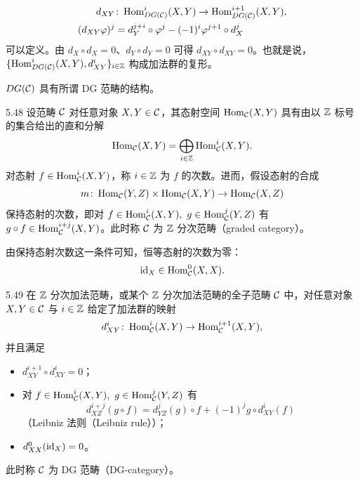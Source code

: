 \[
\begin{aligned}
  d_{XY} &\colon \operatorname{Hom}^{i}_{DG(\mathcal{C})}(X,Y) \to \operatorname{Hom}^{i+1}_{DG(\mathcal{C})}(X,Y),\\
  (d_{XY}\varphi)^{j} &= d^{j+i}_{Y}\circ\varphi^{j} - (-1)^{i}\varphi^{j+1}\circ d^{j}_{X}
\end{aligned}
\]
可以定义。由 $d_{X}\circ d_{X} = 0$、$d_{Y}\circ d_{Y} = 0$ 可得 $d_{XY}\circ d_{XY} = 0$。也就是说，$\{\operatorname{Hom}^{i}_{DG(\mathcal{C})}(X,Y), d^{i}_{XY}\}_{i\in\mathbb{Z}}$ 构成加法群的复形。


$DG(\mathcal{C})$ 具有所谓 DG 范畴的结构。

\begin{definition}{5.48} 设范畴 $\mathcal{C}$ 对任意对象 $X,Y \in \mathcal{C}$，其态射空间 $\operatorname{Hom}_{\mathcal{C}}(X,Y)$ 具有由以 $\mathbb{Z}$ 标号的集合给出的直和分解
\[
  \operatorname{Hom}_{\mathcal{C}}(X,Y) = \bigoplus_{i\in\mathbb{Z}}\operatorname{Hom}^{i}_{\mathcal{C}}(X,Y).
\]
对态射 $f \in \operatorname{Hom}^{i}_{\mathcal{C}}(X,Y)$，称 $i \in \mathbb{Z}$ 为 $f$ 的次数。进而，假设态射的合成
\[
  m \colon \operatorname{Hom}_{\mathcal{C}}(Y,Z) \times \operatorname{Hom}_{\mathcal{C}}(X,Y) \to \operatorname{Hom}_{\mathcal{C}}(X,Z)
\]
保持态射的次数，即对 $f \in \operatorname{Hom}^{i}_{\mathcal{C}}(X,Y),\ g \in \operatorname{Hom}^{j}_{\mathcal{C}}(Y,Z)$ 有 $g\circ f \in \operatorname{Hom}^{i+j}_{\mathcal{C}}(X,Y)$。此时称 $\mathcal{C}$ 为 $\mathbb{Z}$ 分次范畴（graded category）。\end{definition}


由保持态射次数这一条件可知，恒等态射的次数为零：
\[
  \mathrm{id}_{X} \in \operatorname{Hom}^{0}_{\mathcal{C}}(X,X).
\]

\begin{definition}{5.49} 在 $\mathbb{Z}$ 分次加法范畴，或某个 $\mathbb{Z}$ 分次加法范畴的全子范畴 $\mathcal{C}$ 中，对任意对象 $X,Y \in \mathcal{C}$ 与 $i \in \mathbb{Z}$ 给定了加法群的映射
\[
  d^{i}_{XY} \colon \operatorname{Hom}^{i}_{\mathcal{C}}(X,Y) \to \operatorname{Hom}^{i+1}_{\mathcal{C}}(X,Y),
\]
并且满足
\begin{itemize}
  \item $d^{i+1}_{XY}\circ d^{i}_{XY} = 0$；
  \item 对 $f \in \operatorname{Hom}^{i}_{\mathcal{C}}(X,Y),\ g \in \operatorname{Hom}^{j}_{\mathcal{C}}(Y,Z)$ 有
  \[
    d^{i+j}_{XZ}(g\circ f) = d^{j}_{YZ}(g)\circ f + (-1)^{j}g\circ d^{i}_{XY}(f)
  \]
  （Leibniz 法则（Leibniz rule））；
  \item $d^{0}_{XX}(\mathrm{id}_{X}) = 0$。
\end{itemize}
此时称 $\mathcal{C}$ 为 DG 范畴（DG-category）。\end{definition}

